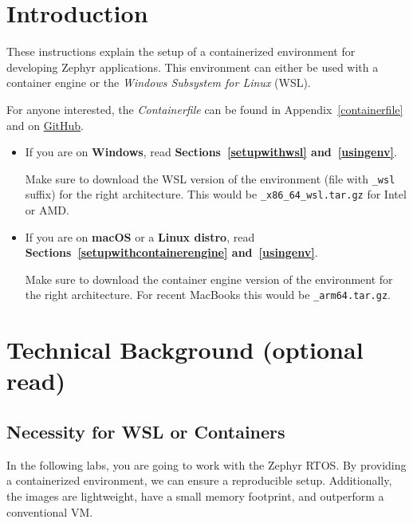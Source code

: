 



\puttitle{}

\section{Introduction}

These instructions explain the setup of a containerized environment for developing Zephyr applications.
This environment can either be used with a container engine or the \emph{Windows Subsystem for Linux} (WSL).

For anyone interested, the \emph{Containerfile} can be found in Appendix~\ref{containerfile}
and on \href{https://github.com/InES-IoT/zephyr_development_environment_container}{GitHub}.

\begin{itemize}
  \item If you are on \textbf{Windows}, read \textbf{Sections~\ref{setupwithwsl} and~\ref{usingenv}}.

    Make sure to download the WSL version of the environment (file with \texttt{\_wsl} suffix) for the right architecture.
    This would be \texttt{\imagename{}\_x86\_64\_wsl.tar.gz} for Intel or AMD.
  \item If you are on \textbf{macOS} or a \textbf{Linux distro}, read \textbf{Sections~\ref{setupwithcontainerengine} and~\ref{usingenv}}.

    Make sure to download the container engine version of the environment for the right architecture.
    For recent MacBooks this would be \texttt{\imagename{}\_arm64.tar.gz}.
\end{itemize}

\newpage

\section{Technical Background (optional read)}

\subsection{Necessity for WSL or Containers}

In the following labs, you are going to work with the Zephyr RTOS.
By providing a containerized environment, we can ensure a reproducible setup.
Additionally, the images are lightweight, have a small memory footprint, and outperform a conventional VM.

